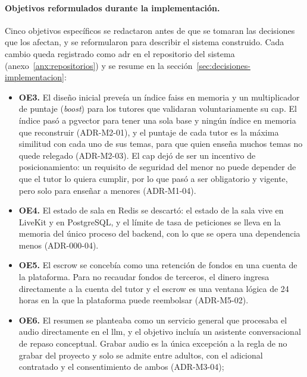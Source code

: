 \paragraph{Objetivos reformulados durante la implementación.} Cinco
objetivos específicos se redactaron antes de que se tomaran las
decisiones que los afectan, y se reformularon para describir el sistema
construido. Cada cambio queda registrado como \gls{adr} en el repositorio del sistema
(anexo~\ref{anx:repositorios}) y se resume en la
sección~\ref{sec:decisiones-implementacion}:
\begin{itemize}
    \item \textbf{OE3.} El diseño inicial preveía un índice \gls{faiss} en
          memoria y un multiplicador de puntaje (\emph{boost}) para los
          tutores que validaran voluntariamente su \gls{cap}. El índice
          pasó a pgvector para tener una sola base y ningún índice en
          memoria que reconstruir (ADR-M2-01), y el puntaje de cada tutor
          es la máxima similitud con cada uno de sus temas, para que
          quien enseña muchos temas no quede relegado (ADR-M2-03). El
          \gls{cap} dejó de ser un incentivo de posicionamiento: un
          requisito de seguridad del menor no puede depender de que el
          tutor lo quiera cumplir, por lo que pasó a ser obligatorio y
          vigente, pero solo para enseñar a menores (ADR-M1-04).
    \item \textbf{OE4.} El estado de sala en Redis se descartó: el estado
          de la sala vive en LiveKit y en PostgreSQL, y el límite de tasa
          de peticiones se lleva en la memoria del único proceso del
          backend, con lo que se opera una dependencia menos
          (ADR-000-04).
    \item \textbf{OE5.} El \gls{escrow} se concebía como una retención de
          fondos en una cuenta de la plataforma. Para no recaudar fondos
          de terceros, el dinero ingresa directamente a la cuenta del
          tutor y el \gls{escrow} es una ventana lógica de 24 horas en la
          que la plataforma puede reembolsar (ADR-M5-02).
    \item \textbf{OE6.} El resumen se planteaba como un servicio general
          que procesaba el audio directamente en el \gls{llm}, y el
          objetivo incluía un asistente conversacional de repaso
          conceptual. Grabar audio es la única excepción a la regla de no
          grabar del proyecto y solo se admite entre adultos, con el
          adicional contratado y el consentimiento de ambos (ADR-M3-04);

\end{itemize}
